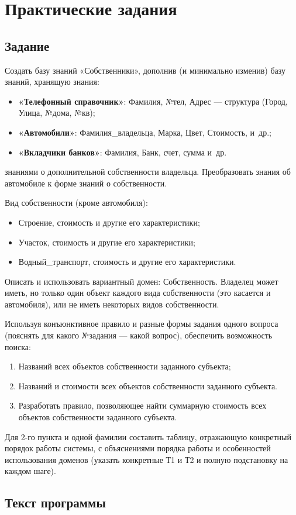 \chapter{Практические задания}

\section{Задание}

Создать базу знаний «Собственники», дополнив (и минимально изменив) базу
знаний, хранящую знания:
\begin{itemize}
    \item \textbf{«Телефонный справочник»}: Фамилия, №тел, Адрес --- структура
        (Город, Улица, №дома, №кв);
    \item \textbf{«Автомобили»}: Фамилия\_владельца, Марка, Цвет, Стоимость,
        и~др.;
    \item \textbf{«Вкладчики банков»}: Фамилия, Банк, счет, сумма и~др.
\end{itemize}
знаниями о дополнительной собственности владельца. Преобразовать знания об
автомобиле к форме знаний о собственности.

Вид собственности (кроме автомобиля):

\begin{itemize}
    \item Строение, стоимость и другие его характеристики;
    \item Участок, стоимость и другие его характеристики;
    \item Водный\_транспорт, стоимость и другие его характеристики.
\end{itemize}

Описать и использовать вариантный домен: Собственность. Владелец может иметь, но
только один объект каждого вида собственности (это касается и автомобиля), или
не иметь некоторых видов собственности.

Используя конъюнктивное правило и разные формы задания одного вопроса (пояснять
для какого №задания --- какой вопрос), обеспечить возможность поиска:

\begin{enumerate}[label=\arabic*)]
    \item Названий всех объектов собственности заданного субъекта;
    \item Названий и стоимости всех объектов собственности заданного субъекта.
    \item Разработать правило, позволяющее найти суммарную стоимость всех
        объектов собственности заданного субъекта.
\end{enumerate}

Для 2-го пункта и одной фамилии составить таблицу, отражающую конкретный порядок
работы системы, с объяснениями порядка работы и особенностей использования
доменов (указать конкретные Т1 и Т2 и полную подстановку на каждом шаге).

\clearpage
\section{Текст программы}


